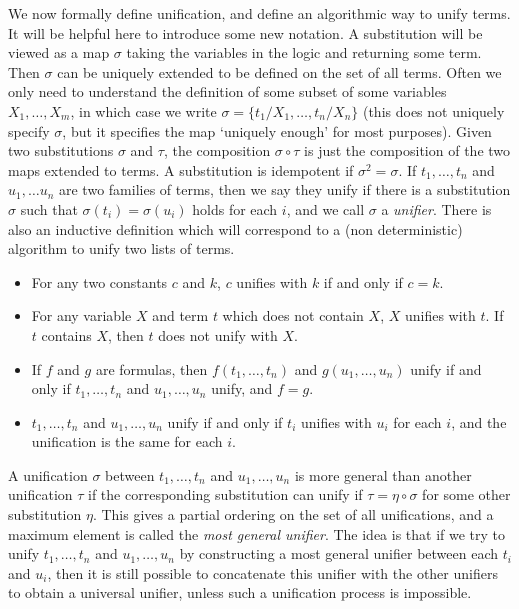 We now formally define unification, and define an algorithmic way to unify terms. It will be helpful here to introduce some new notation. A substitution will be viewed as a map $\sigma$ taking the variables in the logic and returning some term. Then $\sigma$ can be uniquely extended to be defined on the set of all terms. Often we only need to understand the definition of some subset of some variables $X_1, \dots, X_m$, in which case we write $\sigma = \{ t_1/X_1, \dots, t_n/X_n \}$ (this does not uniquely specify $\sigma$, but it specifies the map `uniquely enough' for most purposes). Given two substitutions $\sigma$ and $\tau$, the composition $\sigma \circ \tau$ is just the composition of the two maps extended to terms. A substitution is idempotent if $\sigma^2 = \sigma$. If $t_1, \dots, t_n$ and $u_1, \dots u_n$ are two families of terms, then we say they unify if there is a substitution $\sigma$ such that $\sigma(t_i) = \sigma(u_i)$ holds for each $i$, and we call $\sigma$ a \emph{unifier}. There is also an inductive definition which will correspond to a (non deterministic) algorithm to unify two lists of terms.
%
\begin{itemize}
    \item For any two constants $c$ and $k$, $c$ unifies with $k$ if and only if $c = k$.
    \item For any variable $X$ and term $t$ which does not contain $X$, $X$ unifies with $t$. If $t$ contains $X$, then $t$ does not unify with $X$.
    \item If $f$ and $g$ are formulas, then $f(t_1, \dots, t_n)$ and $g(u_1, \dots, u_n)$ unify if and only if $t_1, \dots, t_n$ and $u_1, \dots, u_n$ unify, and $f = g$.
    \item $t_1, \dots, t_n$ and $u_1, \dots, u_n$ unify if and only if $t_i$ unifies with $u_i$ for each $i$, and the unification is the same for each $i$.
\end{itemize}
%
A unification $\sigma$ between $t_1, \dots, t_n$ and $u_1, \dots, u_n$ is more general than another unification $\tau$ if the corresponding substitution can unify if $\tau = \eta \circ \sigma$ for some other substitution $\eta$. This gives a partial ordering on the set of all unifications, and a maximum element is called the \emph{most general unifier}. The idea is that if we try to unify $t_1, \dots, t_n$ and $u_1, \dots, u_n$ by constructing a most general unifier between each $t_i$ and $u_i$, then it is still possible to concatenate this unifier with the other unifiers to obtain a universal unifier, unless such a unification process is impossible.
